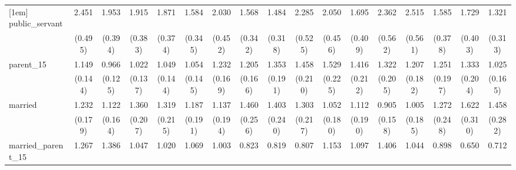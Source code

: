 {\begin{tabular}{l*{16}{c}}
[1em]
public\_servant      &       2.451\sym{***}&       1.953\sym{***}&       1.915\sym{**} &       1.871\sym{**} &       1.584\sym{*}  &       2.030\sym{**} &       1.568\sym{*}  &       1.484         &       2.285\sym{***}&       2.050\sym{**} &       1.695\sym{*}  &       2.362\sym{***}&       2.515\sym{***}&       1.585         &       1.729\sym{*}  &       1.321         \\
                    &     (0.495)         &     (0.394)         &     (0.383)         &     (0.374)         &     (0.345)         &     (0.452)         &     (0.342)         &     (0.318)         &     (0.525)         &     (0.456)         &     (0.409)         &     (0.562)         &     (0.561)         &     (0.378)         &     (0.403)         &     (0.313)         \\
[1em]
parent\_15           &       1.149         &       0.966         &       1.022         &       1.049         &       1.054         &       1.232         &       1.205         &       1.353\sym{*}  &       1.458\sym{**} &       1.529\sym{**} &       1.416\sym{*}  &       1.322         &       1.207         &       1.251         &       1.333         &       1.025         \\
                    &     (0.144)         &     (0.125)         &     (0.137)         &     (0.144)         &     (0.145)         &     (0.169)         &     (0.166)         &     (0.191)         &     (0.210)         &     (0.225)         &     (0.212)         &     (0.205)         &     (0.182)         &     (0.197)         &     (0.204)         &     (0.165)         \\
[1em]
married             &       1.232         &       1.122         &       1.360\sym{*}  &       1.319         &       1.187         &       1.137         &       1.460\sym{*}  &       1.403\sym{*}  &       1.303         &       1.052         &       1.112         &       0.905         &       1.005         &       1.272         &       1.622\sym{*}  &       1.458         \\
                    &     (0.179)         &     (0.164)         &     (0.207)         &     (0.215)         &     (0.191)         &     (0.194)         &     (0.256)         &     (0.240)         &     (0.217)         &     (0.180)         &     (0.190)         &     (0.158)         &     (0.185)         &     (0.248)         &     (0.310)         &     (0.282)         \\
[1em]
married\_parent\_15   &       1.267         &       1.386         &       1.047         &       1.020         &       1.069         &       1.003         &       0.823         &       0.819         &       0.807         &       1.153         &       1.097         &       1.406         &       1.044         &       0.898         &       0.650         &       0.712         \\

\end{tabular}}
